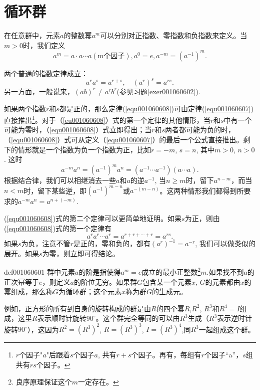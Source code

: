 \section{循环群}\label{section0010606}
在任意群中，元素$a$的整数幂$a^m$可以分别对正指数、零指数和负指数来定义。当$m>0$时，我们定义
\begin{equation}\label{equ001060607}
a^m = a\cdot a \cdots a (\text{m个因子}), a^0 = e, a^{-m} = (a^{-1})^m.
\end{equation}

两个普通的指数定律成立：
\begin{equation}\label{equ001060608}
a^ra^s=a^{r+s}, \quad (a^r)^s = a^{rs}.
\end{equation}
另一方面，一般说来，$(ab)^r \neq a^rb^r$(参见习题\ref{exer001060602}).

如果两个指数$r$和$s$都是正的，那么定律(\ref{equ001060608})可由定律(\ref{equ001060607})直接推出\footnote{$r$个因子"$a$"后跟着$s$个因子$a$, 共有$r+s$个因子。再有，每组有$r$个因子“a”，$s$组共有$rs$个因子。}。对于（\ref{eu001060608}）式的第一个定律的其他情形，当$r$和$s$中有一个可能为零时，（\ref{equ001060608}）式立即得出；当$r$和$s$两者都可能为负的时，（\ref{equ001060608}）式可从定义（\ref{equ001060607}）的最后一个公式直接推出。剩下的情形就是一个指数为负一个指数为正，比如$r=-m$, $s=n$, 其中$m>0$, $n>0$. 这时
\[
a^{-m}a^{n} = (a^{-1})^ma^n = (a^{-1}\cdots a^{-1})(a\cdots a).
\]
根据结合律，我们可以相继消去一些$a$和$a$的逆$a^{-1}$, 当$n \ge m$时，留下$a^{n-m}$，而当$n < m$时，留下某些逆，即$(a^{-1})^{m-n}$或$a^{-(m-n)}$。这两种情形我们都得到所要求的$a^{-m}a^{n} = a^{n + (-m)}$.

(\ref{equ001060608})式的第二个定律可以更简单地证明。如果$s$为正，则由(\ref{equ001060608})式的第一个定律有
\[
a^ra^r\cdots a^r = a^{r+r+\cdots+r} = a^{rs}.
\]
如果$s$为负，注意不管$r$是正的，零和负的，都有$(a^{r})^{-1} = a^{-r}$, 我们可以做类似的展开。如果$s$为零，则立即可得结论。

\begin{definition}{}{def001060601}
群中元素$a$的阶是指使得$a^m=e$成立的最小正整数\footnote{良序原理保证这个$m$一定存在。}$m$.如果找不到$a$的正次幂等于$e$，则定义$a$的阶位无穷。如果群$G$包含某一个元素$x$, $G$的元素都由$x$的幂组成，那么称$G$为循环群；这个元素$x$称为群$G$的生成元。
\end{definition}

例如，正方形的所有到自身的旋转构成的群是由$R$的四个幂$R$,$R^2$, $R^3$和$R^4=I$组成，这里$R$表示顺时针旋转$90^{\circ}$。这个群完全等同的可以由$R^3$生成（$R^3$表示逆时针旋转$90^{\circ}$），这因为$R^2 = (R^3)^2$, $R=(R^{3})^3$, $I=(R^3)^4$,同$R^3$一起组成这个群。

